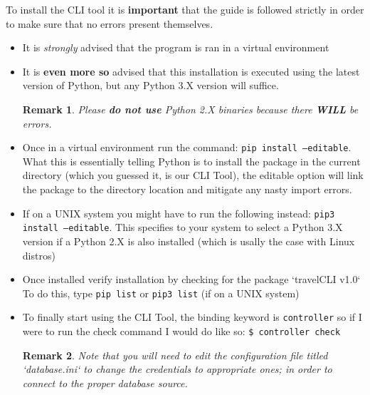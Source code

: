 \documentclass[12pt, lettersize]{article}
\theoremstyle{Remark}
\newtheorem*{remark}{Remark}
\begin{document}
		 
	 To install the CLI tool it is \textbf{important} that the guide is followed strictly in order to make sure that no errors present themselves.
	 
	 \begin{itemize}
	 	
	 	\item It is \textsl{strongly} advised that the program is ran in a virtual environment
	 	
	 	\item It is \textbf{even more so} advised that this installation is executed using the latest version of Python, but any Python 3.X version will suffice.
	 	
	 	\begin{remark}
	 		Please \textbf{do not use} Python 2.X binaries because there \textbf{WILL} be errors.
	 	\end{remark}
	 	
	 	\item  Once in a virtual environment run the command: \texttt{pip install --editable}. \\
	 	What this is essentially telling Python is to install the package in the current directory (which you guessed it, is our CLI Tool), the editable option will link the package to the directory location and mitigate any nasty import errors.
	 	
	 	\item If on a UNIX system you might have to run the following instead:
	 	\texttt{pip3 install --editable}. 
	 	This specifies to your system to select a Python 3.X version if a Python 2.X is also installed (which is usally the case with Linux distros)
	 	
	 	\item Once installed verify installation by checking for the package `travelCLI   v1.0`
	 	To do this, type \texttt{pip list} or \texttt{pip3 list} (if on a UNIX system)
	 	
	 	\item To finally start using the CLI Tool, the binding keyword is \texttt{controller} so if I were to run the check command I would do like so:
	 	\texttt{\$ controller check}
	 	
	 	\begin{remark}
	 		Note that you will need to edit the configuration file titled `database.ini` to change the credentials to appropriate ones; in order to connect to the proper database source.
	 	\end{remark}
	 	
	 \end{itemize}
	 
 
	
\end{document}
